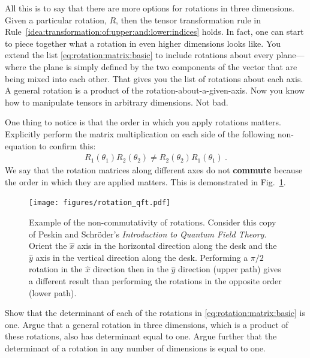 \documentclass[12pt, oneside]{report}    %
\begin{document}
\begin{subappendices}
All this is to say that there are more options for rotations in three dimensions. Given a particular rotation, $R$, then the tensor transformation rule in Rule~\ref{idea:transformation:of:upper:and:lower:indices} holds. In fact, one can start to piece together what a rotation in even higher dimensions looks like. You extend the list \eqref{eq:rotation:matrix:basic} to include rotations about every plane---where the plane is simply defined by the two components of the vector that are being mixed into each other. That gives you the list of rotations about each axis. A general rotation is a product of the rotation-about-a-given-axis. Now you know how to manipulate tensors in arbitrary dimensions. Not bad.

\begin{exercise}
One thing to notice is that the order in which you apply rotations matters. Explicitly perform the matrix multiplication on each side of the following non-equation to confirm this:
\begin{align}
    R_1(\theta_1) R_2(\theta_2) \neq R_2(\theta_2) R_1(\theta_1) \ .
\end{align}
We say that the rotation matrices along different axes do not \textbf{commute} because the order in which they are applied matters. This is demonstrated in Fig.~\ref{fig:rotate:QFT}.
\end{exercise}


\begin{figure}[tb]
    \centering
    \texttt{[image: figures/rotation\_qft.pdf]}
    \caption{Example of the non-commutativity of rotations. Consider this copy of Peskin and Schr\"oder's \emph{Introduction to Quantum Field Theory}. Orient the $\hat x$ axis in the horizontal direction along the desk and the $\hat y$ axis in the vertical direction along the desk. Performing a $\pi/2$ rotation in the $\hat x$ direction then in the $\hat y$ direction (upper path) gives a different result than performing the rotations in the opposite order (lower path).}
    \label{fig:rotate:QFT}
\end{figure}

\begin{exercise}
Show that the determinant of each of the rotations in \eqref{eq:rotation:matrix:basic} is one. Argue that a general rotation in three dimensions, which is a product of these rotations, also has determinant equal to one. Argue further that the determinant of a rotation in any number of dimensions is equal to one.
\end{exercise}


\end{subappendices}
\end{document}

